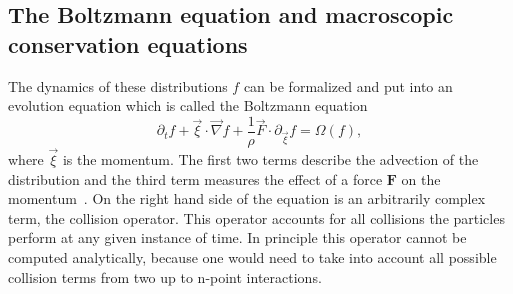 \subsection{The Boltzmann equation and macroscopic conservation equations}
The dynamics of these distributions $f$ can be formalized and put into an evolution equation which is called the Boltzmann equation
\begin{equation}\label{eq:boltzmann_eq}
    \partial_t f + \vec{\xi}\cdot\vec{\nabla} f + \frac{1}{\rho}\vec{F}\cdot\partial_{\vec{\xi}}f = \Omega(f), 
\end{equation}
where $\vec{\xi}$ is the momentum. 
The first two terms describe the advection of the distribution and the third term measures the effect of a force $\mathbf{F}$ on the momentum~\cite{krugerLatticeBoltzmannMethod2017}.
On the right hand side of the equation is an arbitrarily complex term, the collision operator.
This operator accounts for all collisions the particles perform at any given instance of time.
In principle this operator cannot be computed analytically, because one would need to take into account all possible collision terms from two up to n-point interactions.

